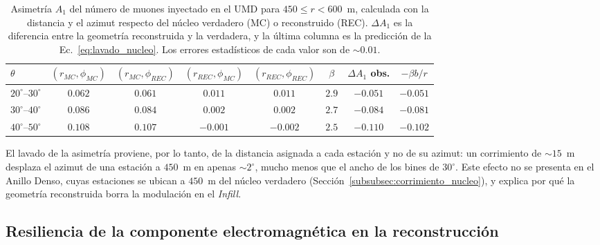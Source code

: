 \begin{table}[H]
	\centering
	\begin{tabular}{lccccccc}
		\toprule
		$\theta$ & $(r_{MC},\phi_{MC})$ & $(r_{MC},\phi_{REC})$ & $(r_{REC},\phi_{MC})$ & $(r_{REC},\phi_{REC})$ & $\beta$ & $\Delta A_1$ obs. & $-\beta b/r$ \\
		\midrule
		$20^\circ$--$30^\circ$ & $0.062$ & $0.061$ & $0.011$ & $0.011$ & $2.9$ & $-0.051$ & $-0.051$ \\
		$30^\circ$--$40^\circ$ & $0.086$ & $0.084$ & $0.002$ & $0.002$ & $2.7$ & $-0.084$ & $-0.081$ \\
		$40^\circ$--$50^\circ$ & $0.108$ & $0.107$ & $-0.001$ & $-0.002$ & $2.5$ & $-0.110$ & $-0.102$ \\
		\bottomrule
	\end{tabular}
	\caption{Asimetría $A_1$ del número de muones inyectado en el UMD para $450 \leq r < 600$~m, calculada con la distancia y el azimut respecto del núcleo verdadero (MC) o reconstruido (REC). $\Delta A_1$ es la diferencia entre la geometría reconstruida y la verdadera, y la última columna es la predicción de la Ec.~\ref{eq:lavado_nucleo}. Los errores estadísticos de cada valor son de $\sim 0.01$.}
	\label{tab:lavado_nucleo}
\end{table}

{\leavevmode\color{blue}El lavado de la asimetría proviene, por lo tanto, de la distancia asignada a cada estación y no de su azimut: un corrimiento de $\sim 15$~m desplaza el azimut de una estación a $450$~m en apenas $\sim 2^\circ$, mucho menos que el ancho de los bines de $30^\circ$. Este efecto no se presenta en el Anillo Denso, cuyas estaciones se ubican a $450$~m del núcleo verdadero (Sección~\ref{subsubsec:corrimiento_nucleo}), y explica por qué la geometría reconstruida borra la modulación en el \textit{Infill}.}



\subsection{Resiliencia de la componente electromagnética en la reconstrucción}
\label{subsec:em_rec}

